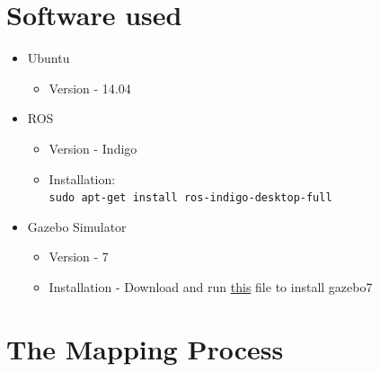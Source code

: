 \documentclass[a4paper,12pt,oneside]{book}
\begin{document}
\section{Software used}
\begin{itemize}  
  \item Ubuntu
  \begin{itemize}
  	\item Version - 14.04
  \end{itemize}
  
  \item ROS
  \begin{itemize}
  	\item Version - Indigo
  	\item Installation: \\
  	\texttt{sudo apt-get install ros-indigo-desktop-full}
  \end{itemize}   
  
  \item Gazebo Simulator
  \begin{itemize}
  	\item Version - 7
  	\item Installation - Download and run \href{https://github.com/eYSIP-2017/eYSIP-2017_Indoor-Environments-Mapping-using-UAV/blob/master/bash_scripts/install_gazebo7.sh}{this} file to install gazebo7
  \end{itemize}
  
\end{itemize}

\section{The Mapping Process}
\end{document}
